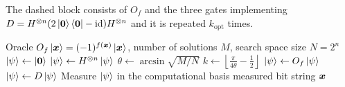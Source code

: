 The dashed block consists of
\(
O_f
\)
and the three gates implementing
\(
D=H^{\otimes n}(2\ket{{\boldsymbol{0}}}\bra{{\boldsymbol{0}}}-\operatorname{id})H^{\otimes n}
\)
and it
is repeated
\(
k_{\mathrm{opt}}
\)
times.




\tikzexternaldisable
\begin{algorithm}[h]
\caption{Grover algorithm}\label{alg:grover}
\begin{algorithmic}[1]
\Require Oracle $O_f\ket{{\boldsymbol{x}}}=(-1)^{f({\boldsymbol{x}})}\ket{{\boldsymbol{x}}}$, number of solutions $M$, search space size $N=2^n$
\State $\ket{\psi}\gets\ket{{\boldsymbol{0}}}$
\State $\ket{\psi}\gets H^{\otimes n}\ket{\psi}$ 
\State $\theta\gets\arcsin\sqrt{M/N}$
\State $k\gets \left\lfloor \frac{\pi}{4\theta}-\frac12\right\rfloor$
  \State $\ket{\psi}\gets O_f\ket{\psi}$ 
  \State $\ket{\psi}\gets D\ket{\psi}$ 
\EndFor
\State Measure $\ket{\psi}$ in the computational basis
\State \Return measured bit string ${\boldsymbol{x}}$
\end{algorithmic}
\end{algorithm}
\tikzexternalenable







